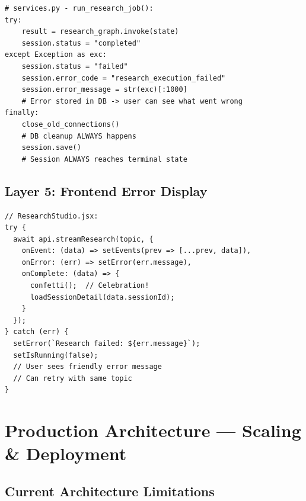 \documentclass[11pt,a4paper,twoside]{report}
\begin{document}
\begin{lstlisting}[style=pythonstyle]
# services.py - run_research_job():
try:
    result = research_graph.invoke(state)
    session.status = "completed"
except Exception as exc:
    session.status = "failed"
    session.error_code = "research_execution_failed"
    session.error_message = str(exc)[:1000]
    # Error stored in DB -> user can see what went wrong
finally:
    close_old_connections()
    # DB cleanup ALWAYS happens
    session.save()
    # Session ALWAYS reaches terminal state
\end{lstlisting}

\section{Layer 5: Frontend Error Display}

\begin{lstlisting}[style=jsstyle]
// ResearchStudio.jsx:
try {
  await api.streamResearch(topic, {
    onEvent: (data) => setEvents(prev => [...prev, data]),
    onError: (err) => setError(err.message),
    onComplete: (data) => {
      confetti();  // Celebration!
      loadSessionDetail(data.sessionId);
    }
  });
} catch (err) {
  setError(`Research failed: ${err.message}`);
  setIsRunning(false);
  // User sees friendly error message
  // Can retry with same topic
}
\end{lstlisting}



\chapter{Production Architecture --- Scaling \& Deployment}

\section{Current Architecture Limitations}
\end{document}

